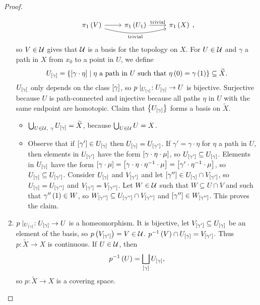\begin{proof}
\begin{enumerate}
$$\begin{tikzcd}
\pi_1\rb{V} \arrow{r} \arrow[bend right=15, swap]{rr}{\text{trivial}} & \pi_1\rb{U_1} \arrow{r}{\text{trivial}} & \pi_1\rb{X}
\end{tikzcd},
$$
so $ V \in \UU $ gives that $ \UU $ is a basis for the topology on $ X $. For $ U \in \UU $ and $ \gamma $ a path in $ X $ from $ x_0 $ to a point in $ U $, we define
$$ U_{\sb{\gamma}} = \cb{\sb{\gamma \cdot \eta} \mid \eta \ \text{a path in} \ U \ \text{such that} \ \eta\rb{0} = \gamma\rb{1}} \subseteq \widetilde{X}. $$
$ U_{\sb{\gamma}} $ only depends on the class $ \sb{\gamma} $, so $ p \mid_{U_{\sb{\gamma}}} : U_{\sb{\gamma}} \to U $ is bijective. Surjective because $ U $ is path-connected and injective because all paths $ \eta $ in $ U $ with the same endpoint are homotopic. Claim that $ \cb{U_{\sb{\gamma}}} $ forms a basis on $ \widetilde{X} $.
\begin{itemize}
\item $ \bigcup_{U \in \UU, \ \gamma} U_{\sb{\gamma}} = \widetilde{X} $, because $ \bigcup_{U \in \UU} U = X $.
\item Observe that if $ \sb{\gamma'} \in U_{\sb{\gamma}} $ then $ U_{\sb{\gamma}} = U_{\sb{\gamma'}} $. If $ \gamma' = \gamma \cdot \eta $ for $ \eta $ a path in $ U $, then elements in $ U_{\sb{\gamma'}} $ have the form $ \sb{\gamma \cdot \eta \cdot \mu} $, so $ U_{\sb{\gamma'}} \subseteq U_{\sb{\gamma}} $. Elements in $ U_{\sb{\gamma}} $ have the form $ \sb{\gamma \cdot \mu} = \sb{\gamma \cdot \eta \cdot \eta^{-1} \cdot \mu} = \sb{\gamma' \cdot \eta^{-1} \cdot \mu} $, so $ U_{\sb{\gamma}} \subseteq U_{\sb{\gamma'}} $. Consider $ U_{\sb{\gamma}} $ and $ V_{\sb{\gamma'}} $ and let $ \sb{\gamma''} \in U_{\sb{\gamma}} \cap V_{\sb{\gamma'}} $, so $ U_{\sb{\gamma}} = U_{\sb{\gamma''}} $ and $ V_{\sb{\gamma'}} = V_{\sb{\gamma''}} $. Let $ W \in \UU $ such that $ W \subseteq U \cap V $ and such that $ \gamma''\rb{1} \in W $, so $ W_{\sb{\gamma''}} \subseteq U_{\sb{\gamma''}} \cap V_{\sb{\gamma''}} $ and $ \sb{\gamma''} \in W_{\sb{\gamma''}} $. This proves the claim.
\end{itemize}
\item $ p \mid_{U_{\sb{\gamma}}} : U_{\sb{\gamma}} \to U $ is a homeomorphism. It is bijective, let $ V_{\sb{\gamma'}} \subseteq U_{\sb{\gamma}} $ be an element of the basis, so $ p\rb{V_{\sb{\gamma'}}} = V \in \UU $. $ p^{-1}\rb{V} \cap U_{\sb{\gamma}} = V_{\sb{\gamma'}} $. Thus $ p : \widetilde{X} \to X $ is continuous. If $ U \in \UU $, then
$$ p^{-1}\rb{U} = \bigsqcup_{\sb{\gamma}} U_{\sb{\gamma}}, $$
so $ p : \widetilde{X} \to X $ is a covering space.

\end{enumerate}
\end{proof}
